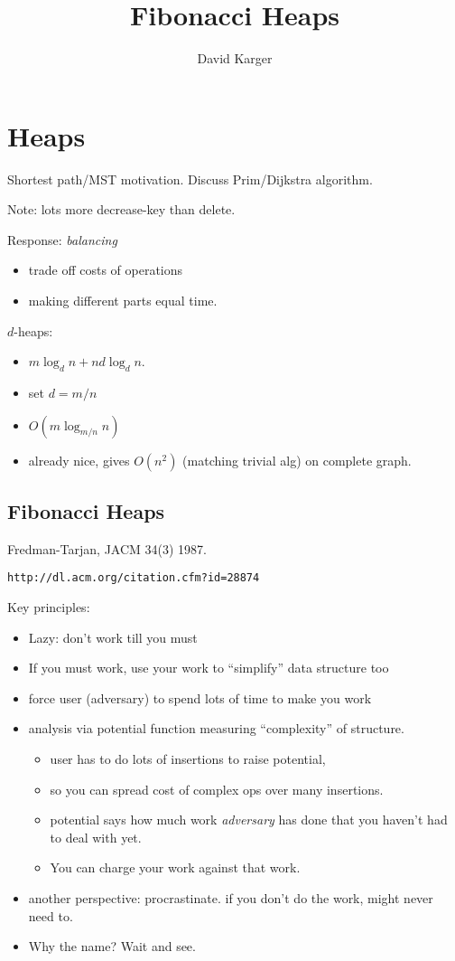 \documentclass{article}
\title{Fibonacci Heaps}
\author{David Karger}
\begin{document}

\section{Heaps}

Shortest path/MST motivation.  Discuss Prim/Dijkstra algorithm.

Note: lots more decrease-key than delete.

Response: \emph{balancing} 
\begin{itemize}
\item trade off costs of operations
\item making different parts equal time.
\end{itemize}

$d$-heaps:
\begin{itemize}
\item  $m\log_d n + nd\log_d n$. 
\item set $d=m/n$
\item $O(m\log_{m/n} n)$
\item already nice, gives $O(n^2)$ (matching trivial alg) on complete graph.
\end{itemize}

\subsection{Fibonacci Heaps}

Fredman-Tarjan, JACM 34(3) 1987. 

{\tt  http://dl.acm.org/citation.cfm?id=28874} 

Key principles:
\begin{itemize}
\item Lazy: don't work till you must
\item If you must work, use your work to ``simplify''
  data structure too
\item force user (adversary) to spend lots of time to make you work
\item analysis via potential function measuring ``complexity'' of
  structure.  
\begin{itemize}
\item user has to do lots of insertions to raise potential, 
\item so you can spread cost of complex ops over many insertions.  
\item potential says how much work \emph{adversary} has done that you
  haven't had to deal with yet.  
\item You can charge your work against that work.
\end{itemize}
\item another perspective: procrastinate.  if you don't do the work,
  might never need to.
\item Why the name?  Wait and see.
\end{itemize}
\end{document}
